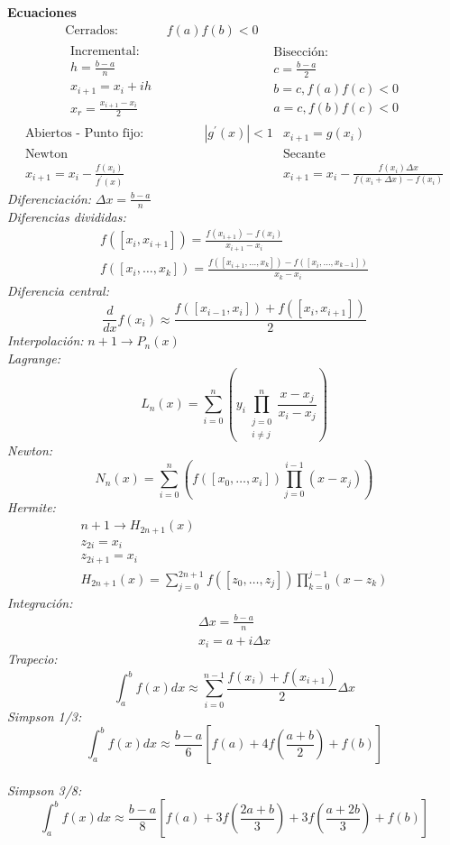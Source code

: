\documentclass[12pt]{article}
\begin{document}
  \clearpage
  \textbf{Ecuaciones}
\begin{align*}
  \text{Cerrados: } & f(a)f(b)<0 &  \\
  \begin{array}{c}
  \text{Incremental:}\\
  h = \frac{b-a}{n} \\
  x_{i+1} = x_i + ih\\
  x_r = \frac{x_{i+1}-x_i}{2}
  \end{array}
  & \qquad \qquad &
  \begin{array}{c}
  \text{Bisección:}\\
  c = \frac{b-a}{2}\\
  b = c, f(a)f(c)<0\\
  a = c, f(b)f(c)<0
  \end{array}
\end{align*}
\begin{align*}
  \text{Abiertos - Punto fijo:}& \qquad \qquad |g^\prime (x)| < 1 & x_{i+1} = g(x_i) \\
  \text{Newton} & & \text{Secante} \\
  x_{i+1} = x_i - \frac{f(x_i)}{f^\prime(x)} & \qquad \qquad &
    x_{i+1} = x_i - \frac{f(x_i)\Delta x}{f(x_i+\Delta x)-f(x_i)}
\end{align*}
  \textit{Diferenciación:} $ \Delta x = \frac{b-a}{n}$\\
  \textit{Diferencias divididas:}
  \begin{eqnarray*}
  f([x_i, x_{i+1}]) = \frac{f(x_{i+1})-f(x_i)}{x_{i+1}-x_i}\\
  f([x_i, \ldots, x_k]) = \frac{f([x_{i+1}, \ldots, x_k]) - f([x_i, \ldots, x_{k-1}])}{x_k - x_i}
  \end{eqnarray*}
  \textit{Diferencia central:} $$\frac{d}{dx}f(x_i) \approx \frac{f([x_{i-1}, x_i])+f([x_{i}, x_{i+1}])}{2} $$
  \textit{Interpolación:} $n+1 \rightarrow P_n(x)$\\
  \textit{Lagrange:} $$L_n(x) = \sum_{i=0}^n \left(y_i\prod_{\substack{j=0 \\ i \neq j}}^n \frac{x-x_j}{x_i - x_j}\right)$$
  \textit{Newton:} $$N_n(x) = \sum_{i=0}^n \left(f([x_0, \ldots, x_i]) \prod_{j=0}^{i-1}(x-x_j)\right)$$
  \textit{Hermite:}
  \begin{eqnarray*}
  n+1 \rightarrow H_{2n+1}(x)\\
  z_{2i} = x_i\\
  z_{2i+1} = x_i\\
  H_{2n+1}(x) = \sum_{j=0}^{2n+1}f([z_0, \ldots, z_j])\prod_{k=0}^{j-1}(x - z_k)
  \end{eqnarray*}
  \textit{Integración:}
  \begin{eqnarray*}
   \Delta x = \frac{b-a}{n}\\
   x_i = a + i \Delta x
  \end{eqnarray*}
  \textit{Trapecio:}
  $$\int_a^b f(x)dx \approx \sum_{i=0}^{n-1} \frac{f(x_i) + f(x_{i+1})}{2}\Delta x$$
  \textit{Simpson 1/3:}
  $$ \int_a^b f(x)dx \approx \frac{b-a}{6} \left[f(a) + 4f\left(\frac{a+b}{2} \right) + f(b) \right] $$\\
  \textit{Simpson 3/8:}
  $$ \int_a^b f(x)dx \approx \frac{b-a}{8} \left[f(a) + 3f\left(\frac{2a+b}{3}\right) + 3f\left(\frac{a+2b}{3}\right) + f(b) \right] $$
\end{document}
